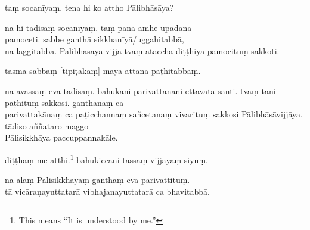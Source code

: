 \begin{answerkey}
\item ta\d m socan\=iya\d m. tena hi ko attho P\=alibh\=as\=aya?
\item na hi t\=adisa\d m socan\=iya\d m. ta\d m pana amhe up\=ad\=an\=a \\pamoceti. sabbe ganth\=a sikkhan\=iy\=a/uggahitabb\=a, \\na laggitabb\=a. P\=alibh\=as\=aya vijj\=a tva\d m atacch\=a di\d t\d thiy\=a pamocitu\d m sakkoti.
\item tasm\=a sabba\d m [tipi\d taka\d m] may\=a attan\=a pa\d thitabba\d m.
\item na avassa\d m eva t\=adisa\d m. bahuk\=ani parivattan\=ani ett\=avat\=a santi. tva\d m t\=ani pa\d thitu\d m sakkosi. ganth\=ana\d m ca \\parivattak\=ana\d m ca pa\d ticchanna\d m sa\~ncetana\d m vivaritu\d m sakkosi P\=alibh\=as\=avijj\=aya. t\=adiso a\~n\~nataro maggo \\P\=alisikkh\=aya paccuppannak\=ale.
\item di\d t\d tha\d m me atthi.\footnote{This means ``It is understood by me.''} bahukicc\=ani tassa\d m vijj\=aya\d m siyu\d m.
\item na ala\d m P\=alisikkh\=aya\d m gantha\d m eva parivattitu\d m. \\t\=a vic\=ara\d nayuttatar\=a vibhajanayuttatar\=a ca bhavitabb\=a.
\end{answerkey}

